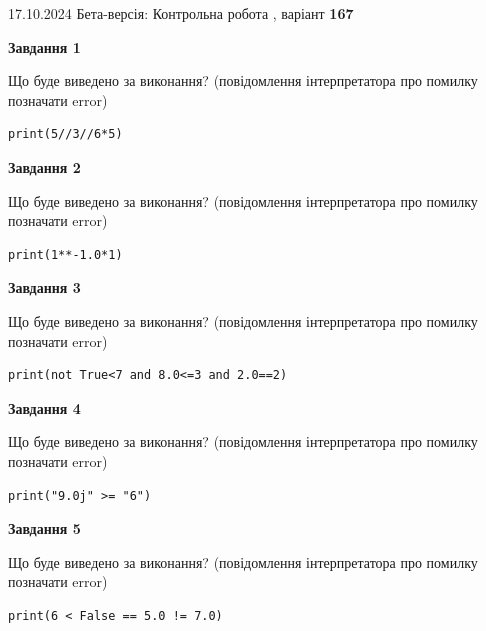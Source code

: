 \documentclass[12pt, ukrainian]{article}
\begin{document}
{\Large{17.10.2024 Бета-версія: Контрольна робота , варіант  \No \textbf { 167 }\par}}
{
\begin {large}
{\begin {center}\textbf{Завдання 1}\end {center}}

Що буде виведено за виконання? (повідомлення інтерпретатора про помилку позначати error)\par
\begin{verbatim}
print(5//3//6*5)
\end{verbatim}

{\begin {center}\textbf{Завдання 2}\end {center}}

Що буде виведено за виконання? (повідомлення інтерпретатора про помилку позначати error)\par
\begin{verbatim}
print(1**-1.0*1)
\end{verbatim}

{\begin {center}\textbf{Завдання 3}\end {center}}

Що буде виведено за виконання? (повідомлення інтерпретатора про помилку позначати error)\par
\begin{verbatim}
print(not True<7 and 8.0<=3 and 2.0==2)
\end{verbatim}

{\begin {center}\textbf{Завдання 4}\end {center}}

Що буде виведено за виконання? (повідомлення інтерпретатора про помилку позначати error)\par
\begin{verbatim}
print("9.0j" >= "6")
\end{verbatim}

{\begin {center}\textbf{Завдання 5}\end {center}}

Що буде виведено за виконання? (повідомлення інтерпретатора про помилку позначати error)\par
\begin{verbatim}
print(6 < False == 5.0 != 7.0)
\end{verbatim}


\end{large}}
\end{document}
